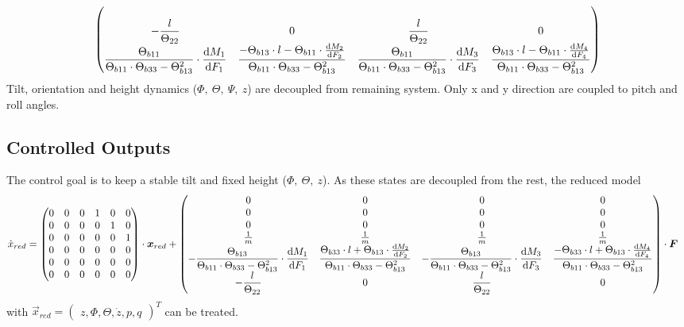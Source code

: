 \begin{align*}
\begin{pmatrix}
	\\
	-\dfrac{l}{\Theta_{22}} & 0 & \dfrac{l}{\Theta_{22}} & 0
	\\
	\dfrac{\Theta_{b11}}{\Theta_{b11} \cdot \Theta_{b33} - \Theta_{b13}^2} \cdot \dfrac{\text{d}M_1}{\text{d}F_1} & \dfrac{-\Theta_{b13}\cdot l - \Theta_{b11} \cdot \frac{\text{d}M_2}{\text{d}F_2} }{\Theta_{b11} \cdot \Theta_{b33} - \Theta_{b13}^2} & \dfrac{\Theta_{b11}}{\Theta_{b11} \cdot \Theta_{b33} - \Theta_{b13}^2} \cdot \dfrac{\text{d}M_3}{\text{d}F_3} & \dfrac{\Theta_{b13}\cdot l - \Theta_{b11} \cdot \frac{\text{d}M_4}{\text{d}F_4} }{\Theta_{b11} \cdot \Theta_{b33} - \Theta_{b13}^2}
	\end{pmatrix}
\end{align*}
Tilt, orientation and height dynamics ($\Phi,~\Theta,~\Psi,~z$) are decoupled from remaining system. Only x and y direction are coupled to pitch and roll angles.
\clearpage

\subsection{Controlled Outputs}
The control goal is to keep a stable tilt and fixed height ($\Phi,~\Theta,~z$). As these states are decoupled from the rest, the reduced model 
\begin{align}
	\dot{x}_{red} &= \begin{pmatrix} 0 & 0 & 0 & 1 & 0 & 0 \\
									 0 & 0 & 0 & 0 & 1 & 0 \\
									 0 & 0 & 0 & 0 & 0 & 1 \\
									 0 & 0 & 0 & 0 & 0 & 0 \\
									 0 & 0 & 0 & 0 & 0 & 0 \\
									 0 & 0 & 0 & 0 & 0 & 0 
					 \end{pmatrix} \cdot \boldsymbol{x}_{red} + 
					 \begin{pmatrix}
					 	0 & 0 & 0 & 0 \\
					 	0 & 0 & 0 & 0 \\
					 	0 & 0 & 0 & 0 \\
					 	\frac{1}{m} & \frac{1}{m} & \frac{1}{m} & \frac{1}{m} \\
					 	-\dfrac{\Theta_{b13}}{\Theta_{b11} \cdot \Theta_{b33} - \Theta_{b13}^2} \cdot \dfrac{\text{d}M_1}{\text{d}F_1} & \dfrac{\Theta_{b33}\cdot l + \Theta_{b13} \cdot \frac{\text{d}M_2}{\text{d}F_2} }{\Theta_{b11} \cdot \Theta_{b33} - \Theta_{b13}^2}  & -\dfrac{\Theta_{b13}}{\Theta_{b11} \cdot \Theta_{b33} - \Theta_{b13}^2} \cdot \dfrac{\text{d}M_3}{\text{d}F_3} & \dfrac{-\Theta_{b33}\cdot l + \Theta_{b13} \cdot \frac{\text{d}M_4}{\text{d}F_4} }{\Theta_{b11} \cdot \Theta_{b33} - \Theta_{b13}^2} 
					 	\\
					 	-\dfrac{l}{\Theta_{22}} & 0 & \dfrac{l}{\Theta_{22}} & 0
					 \end{pmatrix} \cdot \boldsymbol{F} \label{eq:mdl_linearized}
\end{align}
with $\vec{x}_{red} = \begin{pmatrix} z, \Phi, \Theta, \dot{z}, p, q \end{pmatrix}^T$ can be treated.
\clearpage


